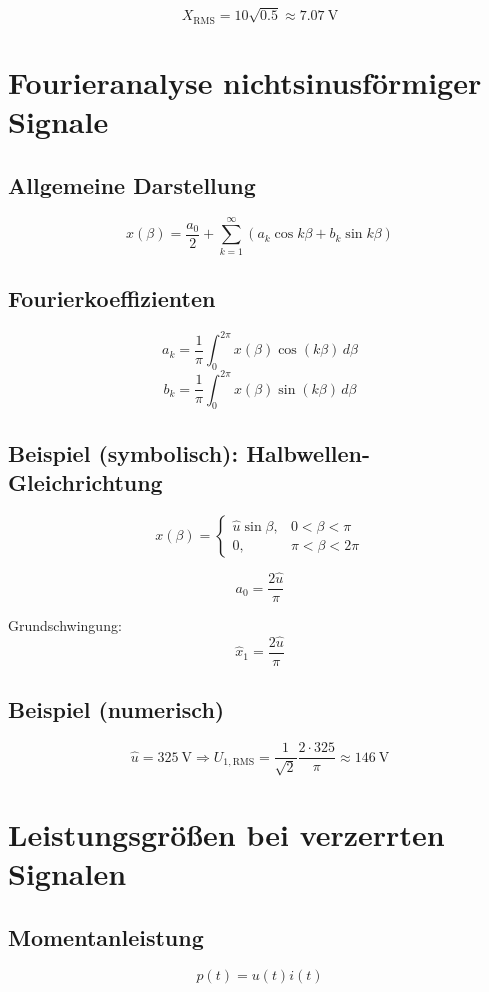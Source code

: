 \documentclass[a4paper,11pt]{article}
\begin{document}
\[
X_{\mathrm{RMS}}=10\sqrt{0.5}\approx\SI{7.07}{\volt}
\]

\section{Fourieranalyse nichtsinusförmiger Signale}

\subsection{Allgemeine Darstellung}
\[
x(\beta)=\frac{a_0}{2}+\sum_{k=1}^{\infty}\left(a_k\cos k\beta+b_k\sin k\beta\right)
\]

\subsection{Fourierkoeffizienten}
\[
a_k=\frac{1}{\pi}\int_0^{2\pi}x(\beta)\cos(k\beta)\,d\beta
\]
\[
b_k=\frac{1}{\pi}\int_0^{2\pi}x(\beta)\sin(k\beta)\,d\beta
\]

\subsection*{Beispiel (symbolisch): Halbwellen-Gleichrichtung}
\[
x(\beta)=
\begin{cases}
\hat{u}\sin\beta,&0<\beta<\pi\\
0,&\pi<\beta<2\pi
\end{cases}
\]

\[
a_0=\frac{2\hat{u}}{\pi}
\]

Grundschwingung:
\[
\hat{x}_1=\frac{2\hat{u}}{\pi}
\]

\subsection*{Beispiel (numerisch)}
\[
\hat{u}=\SI{325}{\volt}
\Rightarrow
U_{1,\mathrm{RMS}}=\frac{1}{\sqrt{2}}\frac{2\cdot325}{\pi}\approx\SI{146}{\volt}
\]

\section{Leistungsgrößen bei verzerrten Signalen}

\subsection{Momentanleistung}
\[
p(t)=u(t)i(t)
\]
\end{document}
